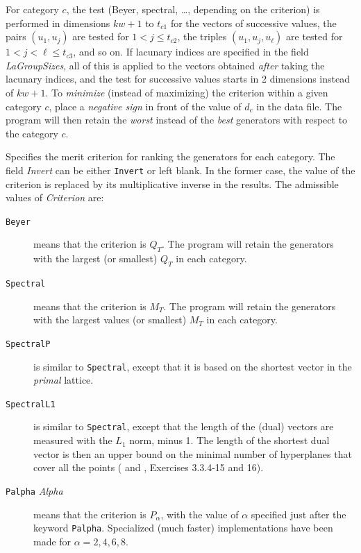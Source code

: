 \begin {description}
  For category $c$, the test (Beyer, spectral, \dots, depending on
  the criterion) is performed in dimensions $kw+1$ to $t_{c1}$ 
  for the vectors of successive values,
  the pairs $(u_1, u_{j})$ are tested for $1 <j\le t_{c2}$,
  the triples $(u_1, u_{j}, u_{\ell})$ are tested for $1 <j <\ell\le t_{c3}$,
  and so on.  
  If lacunary indices are specified in the field {\em LaGroupSizes},
  all of this is applied to the vectors obtained {\em after\/} taking
  the lacunary indices, and the test for successive values starts in 
  2 dimensions instead of $kw+1$.
  To {\em minimize\/} (instead of maximizing) the criterion within a 
  given category $c$, place a {\em negative sign\/} in front of the value
  of $d_c$ in the data file.
  The program will then retain the {\em worst\/} instead of the
  {\em best\/} generators with respect to the category $c$.
%
\item [{\em Criterion} ~\<{\em Invert\/}\> ~\<{\em Norm\/}\> :]
  Specifies the merit criterion for ranking the generators for each category.
  The field {\em Invert\/} can be either {\tt Invert} or left blank.
  In the former case, the value of the criterion is
  replaced by its multiplicative inverse in the results.
  The admissible values of {\em Criterion\/} are:
  \begin {description}
  \item [{\tt Beyer}] means that the criterion is $Q_T$.
    The program will retain the generators with the largest 
    (or smallest) $Q_T$ in each category.
  \item [{\tt Spectral}] means that the criterion is $M_T$.
    The program will retain the generators with the largest values
    (or smallest) $M_T$ in each category.
  \item [{\tt SpectralP}] is similar to {\tt Spectral}, except that
    it is based on the shortest vector in the {\em primal\/} lattice.
  \item [{\tt SpectralL1}] is similar to {\tt Spectral}, except that
    the length of the (dual) vectors are measured with the $L_1$ norm,
    minus 1.  The length of the shortest dual vector is then an upper
    bound on the minimal number of hyperplanes that cover all the points
    (\cite{rDIE75a} and \cite{rKNU97a}, Exercises 3.3.4-15 and 16).
  \item [{\tt Palpha} {\em Alpha}] means that the criterion is $P_\alpha$,
    with the value of $\alpha$ specified just after the keyword {\tt Palpha}.
    Specialized (much faster) implementations have been made for $\alpha = 2, 4, 6, 8$.
  \end {description}

\end{description}
